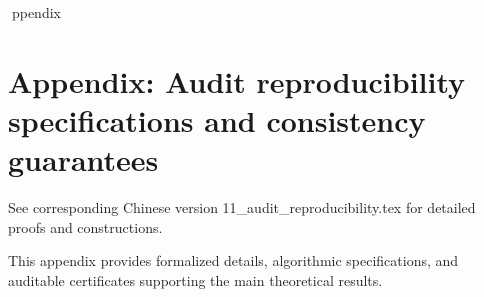 ppendix

\section*{Appendix: Audit reproducibility specifications and consistency guarantees}

See corresponding Chinese version 11_audit_reproducibility.tex for detailed proofs and constructions.

This appendix provides formalized details, algorithmic specifications, and auditable certificates supporting the main theoretical results.
